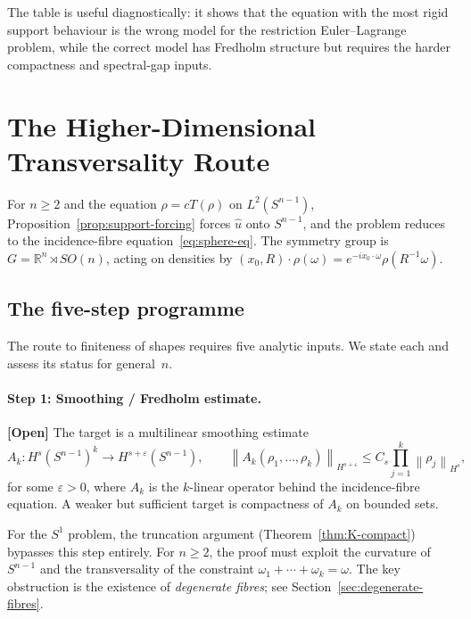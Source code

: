 \documentclass[12pt]{article}
\theoremstyle{definition}
\theoremstyle{remark}
\newcommand{\R}{\mathbb{R}}
\newcommand{\wh}{\widehat}
\newcommand{\norm}[1]{\left\|#1\right\|}
\newcommand{\open}{\textbf{\color{red}[Open]}}
\begin{document}
The table is useful diagnostically: it shows that the equation with the
most rigid support behaviour is the wrong model for the restriction
Euler--Lagrange problem, while the correct model has Fredholm structure but
requires the harder compactness and spectral-gap inputs.



\section{The Higher-Dimensional Transversality Route}
\label{sec:higher-dim}

For $n\geq 2$ and the equation $\rho=cT(\rho)$ on $L^2(S^{n-1})$,
Proposition~\ref{prop:support-forcing} forces $\wh u$ onto $S^{n-1}$,
and the problem reduces to the incidence-fibre equation~\eqref{eq:sphere-eq}.
The symmetry group is $G=\R^n\rtimes SO(n)$, acting on densities by
$(x_0,R)\cdot\rho(\omega)=e^{-ix_0\cdot\omega}\rho(R^{-1}\omega)$.

\subsection{The five-step programme}

The route to finiteness of shapes requires five analytic inputs.  We state
each and assess its status for general~$n$.

\paragraph{Step 1: Smoothing / Fredholm estimate.}  \open\quad
The target is a multilinear smoothing estimate
\[
  A_k:H^s(S^{n-1})^k\to H^{s+\varepsilon}(S^{n-1}),
  \qquad
  \norm{A_k(\rho_1,\ldots,\rho_k)}_{H^{s+\varepsilon}}
  \leq C_s\prod_{j=1}^k\norm{\rho_j}_{H^s},
\]
for some $\varepsilon>0$, where $A_k$ is the $k$-linear operator behind
the incidence-fibre equation.  A weaker but sufficient target is
compactness of $A_k$ on bounded sets.

For the $S^1$ problem, the truncation argument
(Theorem~\ref{thm:K-compact}) bypasses this step entirely.  For $n\geq 2$,
the proof must exploit the curvature of $S^{n-1}$ and the transversality
of the constraint $\omega_1+\cdots+\omega_k=\omega$.  The key obstruction
is the existence of \emph{degenerate fibres}; see
Section~\ref{sec:degenerate-fibres}.
\end{document}
